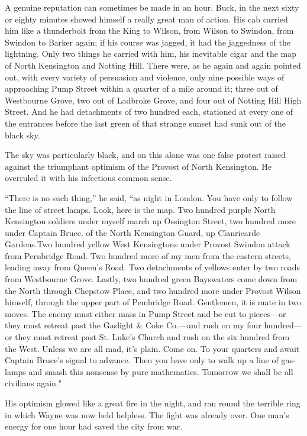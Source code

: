 \documentclass{book}
\begin{document}
A genuine reputation can sometimes be made in an hour. Buck, in the next sixty or eighty minutes showed himself a really great man of action. His cab carried him like a thunderbolt from the King to Wilson, from Wilson to Swindon, from Swindon to Barker again; if his course was jagged, it had the jaggedness of the lightning. Only two things he carried with him, his inevitable cigar and the map of North Kensington and Notting Hill. There were, as he again and again pointed out, with every variety of persuasion and violence, only nine possible ways of approaching Pump Street within a quarter of a mile around it; three out of Westbourne Grove, two out of Ladbroke Grove, and four out of Notting Hill High Street. And he had detachments of two hundred each, stationed at every one of the entrances before the last green of that strange sunset had sunk out of the black sky.

The sky was particularly black, and on this alone was one false protest raised against the triumphant optimism of the Provost of North Kensington. He overruled it with his infectious common sense.

“There is no such thing,” he said, “as night in London. You have only to follow the line of street lamps. Look, here is the map. Two hundred purple North Kensington soldiers under myself march up Ossington Street, two hundred more under Captain Bruce. of the North Kensington Guard, up Clanricarde Gardens.\footnotemark[1] Two hundred yellow West Kensingtons under Provost Swindon attack from Pernbridge Road. Two hundred more of my men from the eastern streets, leading away from Queen’s Road. Two detachments of yellows enter by two roads from Westbourne Grove. Lastly, two hundred green Bayswaters come down from the North through Chepstow Place, and two hundred more under Provost Wilson himself, through the upper part of Pembridge Road. Gentlemen, it is mate in two moves. The enemy must either mass in Pump Street and be cut to pieces—or they must retreat past the Gaslight \& Coke Co.—and rush on my four hundred—or they must retreat past St. Luke’s Church and rush on the six hundred from the West. Unless we are all mad, it’s plain. Come on. To your quarters and await Captain Bruce’s signal to advance. Then you have only to walk up a line of gas-lamps and smash this nonsense by pure mathematics. Tomorrow we shall be all civilians again."

His optimism glowed like a great fire in the night, and ran round the terrible ring in which Wayne was now held helpless. The fight was already over. One man’s energy for one hour had saved the city from war.
\end{document}
